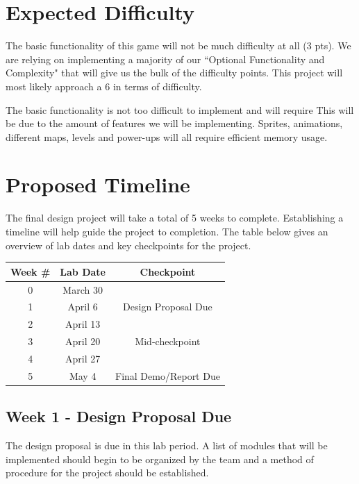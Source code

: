\documentclass[journal, twocolumn, final,11pt,letterpaper]{IEEEtran}
\begin{document}
\section{Expected Difficulty}
The basic functionality of this game will not be much difficulty at all (3 pts). We are relying on implementing a majority of our ``Optional Functionality and Complexity" that will give us the bulk of the difficulty points. This project will most likely approach a 6 in terms of difficulty. 

The basic functionality is not too difficult to implement and will require  This will be due to the amount of features we will be implementing. Sprites, animations, different maps, levels and power-ups will all require efficient memory usage. 

\section{Proposed Timeline} 
The final design project will take a total of 5 weeks to complete. Establishing a timeline will help guide the project to completion.  The table below gives an overview of lab dates and key checkpoints for the project.

\begin{table}[htbp]
	\centering
	\begin{tabular}{ccc}	%
		\toprule	%
		Week \# & Lab Date & Checkpoint \\
		\midrule
		0 & March 30 & \\
		1 & April 6 & Design Proposal Due \\
		2 & April 13 & \\
		3 & April 20 & Mid-checkpoint \\
		4 & April 27 & \\
		5 & May 4 & Final Demo/Report Due \\
		
		\bottomrule	%
	\end{tabular}%
	\label{tab:table1}	%
\end{table}%

\subsection{Week 1 - Design Proposal Due} 
The design proposal is due in this lab period.  A list of modules that will be implemented should begin to be organized by the team and a method of procedure for the project should be established.  
\end{document}

